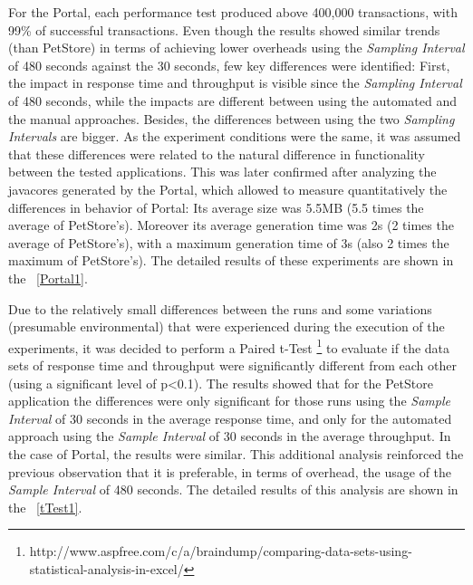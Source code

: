 \documentclass[runningheads,a4paper]{llncs}
\begin{document}
For the Portal, each performance test produced above 400,000 transactions,
with 99\% of successful transactions. Even though the results showed similar
trends (than PetStore) in terms of achieving lower overheads using the
\emph{Sampling Interval} of 480 seconds against the 30 seconds, few key 
differences were identified: First, the impact in response time and
throughput is visible since the \emph{Sampling Interval} of 480 seconds, 
while the impacts are different between using the automated and the manual
approaches. Besides, the differences between using the two \emph{Sampling Intervals} 
are bigger. As the experiment conditions were the same, it was assumed that these 
differences were related to the natural difference in functionality between the
tested applications. This was later confirmed after analyzing the javacores
generated by the Portal, which allowed to measure quantitatively the
differences in behavior of Portal: Its average size was 5.5MB (5.5 times the
average of PetStore's). Moreover its average generation time was 2s (2 times the 
average of PetStore's), with a maximum generation time of 3s (also 2 times the
maximum of PetStore's). The detailed results of these experiments are shown in the \tablename ~\ref{Portal1}.

Due to the relatively small differences between the runs and some variations
(presumable environmental) that were experienced during the execution of the
experiments, it was decided to perform a Paired t-Test
\footnote{http://www.aspfree.com/c/a/braindump/comparing-data-sets-using-statistical-analysis-in-excel/}
to evaluate if the data sets of response time and throughput were significantly
different from each other (using a significant level of p<0.1). The results
showed that for the PetStore application the differences were only significant for
those runs using the \emph{Sample Interval} of 30 seconds in the average
response time, and only for the automated approach using the \emph{Sample
Interval} of 30 seconds in the average throughput. In the case of Portal, the
results were similar. This additional analysis reinforced the previous
observation that it is preferable, in terms of overhead, the usage of the \emph{Sample Interval} 
of 480 seconds. The detailed results of this analysis are shown in the
\tablename ~\ref{tTest1}.
\end{document}
